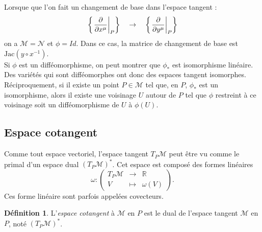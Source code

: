 \documentclass[a4paper,11pt]{report}
\theoremstyle{definition}
\theoremstyle{plain}
\theoremstyle{definition}
\newtheorem{defn}{Définition}[chapter]
\theoremstyle{remark}
\newcommand{\M}{\mathscr{M}}
\newcommand{\N}{\mathscr{N}}
\begin{document}
                Lorsque que l'on fait un changement de base dans l'espace tangent : 
                \begin{equation*}
                    \left\{\eval{\pdv{}{x^\mu}}_{P}\right\}\quad\to\quad \left\{\eval{\pdv{}{y^\mu}}_P\right\}
                \end{equation*}
                on a $\M=\N$ et $\phi = Id$. Dans ce cas, la matrice de changement de base est $\text{Jac}(y\circ x^{-1})$.\\
                
                Si $\phi$ est un difféomorphisme, on peut montrer que $\phi_*$ est isomorphisme linéaire. Des variétés qui sont difféomorphes ont donc des espaces tangent isomorphes. Réciproquement, si il existe un point $P\in\M$ tel que, en $P$, $\phi_*$ est un isomorphisme, alors il existe une voisinage $U$ autour de $P$ tel que $\phi$ restreint à ce voisinage soit un difféomorphisme de $U$ à $\phi(U)$.
                
                
            
            \subsection{Espace cotangent}
            
                Comme tout espace vectoriel, l'espace tangent $T_P\M$ peut être vu comme le primal d'un espace dual $(T_P\M)^*$. Cet espace est composé des formes linéaires
                \begin{equation}
                    \omega:\left(
                \begin{array}{ccc}
                    T_P\M & \longrightarrow & \mathbb{R} \\
                    V & \longmapsto & \omega(V)
                \end{array}
                \right).
                \end{equation}
                Ces forme linéaire sont parfois appelées covecteurs.
                
                \begin{defn}
                    L'\textit{espace cotangent} à $\M$ en $P$ est le dual de l'espace tangent $\M$ en $P$, noté $(T_P\M)^*$.
                \end{defn}
                
\end{document}
